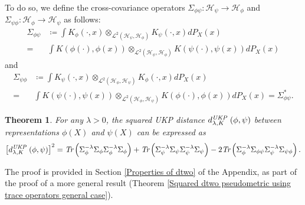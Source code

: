 \documentclass{article} %
\newcommand{\HS}{\mathcal{L}^{2}}
\newcommand{\repone}{\phi}
\newcommand{\reptwo}{\psi}
\newcommand{\Hone}{\mathcal{H}_{\phi}}
\newcommand{\Htwo}{\mathcal{H}_{\psi}}
\newcommand{\metricstname}{UKP }
\theoremstyle{plain}
\newcounter{theoremno}
\newtheorem{theorem}[theoremno]{Theorem}
\begin{document}
To do so, we define the cross-covariance operators $\Sigma_{\repone\reptwo}: \Htwo \to \Hone$ and $\Sigma_{\reptwo\repone}: \Hone \to \Htwo$ as follows:
\[
\begin{aligned}
    \Sigma_{\repone\reptwo} &\coloneq\int K_{\repone}(\cdot,x) \otimes_{\HS(\Htwo,\Hone)}  K_{\reptwo}(\cdot,x) dP_{X}(x) \\
    =& \int K(\repone(\cdot),\repone(x)) \otimes_{\HS(\Htwo,\Hone)}  K(\reptwo(\cdot),\reptwo(x)) dP_{X}(x)
\end{aligned}
\]and
\[
\begin{aligned}
    \Sigma_{\reptwo\repone} &\coloneq \int K_{\reptwo}(\cdot,x) \otimes_{\HS(\Hone,\Htwo)} K_{\repone}(\cdot,x) dP_{X}(x)\\
    =& \int  K(\reptwo(\cdot),\reptwo(x))\otimes_{\HS(\Hone,\Htwo)}  K(\repone(\cdot),\repone(x))dP_{X}(x)
    = \Sigma_{\repone\reptwo}^{*}.
\end{aligned}
\]

\begin{theorem}\label{Squared pseudometric using trace operators}
    For any $\lambda>0$, the squared \emph{\metricstname} distance $d_{\lambda,K}^{\emph{\metricstname}}(\repone,\reptwo)$ between representations $\repone(X)$ and $\reptwo(X)$ can be expressed as
    \[
\begin{aligned}
        \left[d_{\lambda,K}^{\emph{\metricstname}}(\repone,\reptwo)\right]^{2}
        = \emph{Tr}\left(\Sigma_{\repone}^{-\lambda}\Sigma_{\repone}\Sigma_{\repone}^{-\lambda}\Sigma_{\repone}\right) + \emph{Tr}\left(\Sigma_{\reptwo}^{-\lambda}\Sigma_{\reptwo}\Sigma_{\reptwo}^{-\lambda}\Sigma_{\reptwo}\right)-2\emph{Tr}\left(\Sigma_{\repone}^{-\lambda}\Sigma_{\repone\reptwo}\Sigma_{\reptwo}^{-\lambda}\Sigma_{\reptwo\repone}\right).
    \end{aligned}
    \]
\end{theorem}

The proof is provided in Section \ref{Properties of dtwo} of the Appendix, as part of the proof of a more general result (Theorem \ref{Squared dtwo pseudometric using trace operators general case}). 

\end{document}
